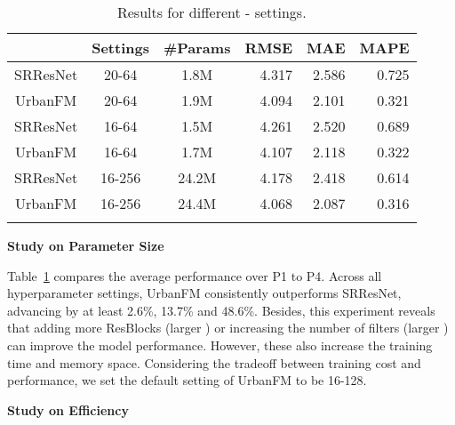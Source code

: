 \begin{table}[!b]
  \centering
  \caption{Results for different - settings.}
  \vspace{-1em}
    \begin{tabular}{c|cc|rrr}
\shline
    \multicolumn{1}{c|}{Methods} & \multicolumn{1}{l}{Settings} & \multicolumn{1}{l|}{\#Params} & \multicolumn{1}{l}{RMSE} & \multicolumn{1}{l}{MAE} & \multicolumn{1}{l}{MAPE} \\
\hline
    SRResNet & 20-64 & 1.8M  & 4.317 & 2.586 & 0.725 \\
    UrbanFM & 20-64 & 1.9M  & 4.094 & 2.101 & 0.321 \\
\hline
    SRResNet & 16-64 & 1.5M  & 4.261 & 2.520 & 0.689 \\
    UrbanFM & 16-64 & 1.7M  & 4.107 & 2.118 & 0.322 \\
\hline
    SRResNet & 16-256 & 24.2M & 4.178 & 2.418 & 0.614 \\
    UrbanFM & 16-256 & 24.4M & 4.068 & 2.087 & 0.316 \\
\shline
    \end{tabular}\label{tab:params}\end{table} 
\vspace{1mm}
\noindent\textbf{Study on Parameter Size}

\noindent Table~\ref{tab:params} compares the average performance over P1 to P4. Across all hyperparameter settings, UrbanFM consistently outperforms SRResNet, advancing by at least 2.6\%, 13.7\% and 48.6\%. Besides, this experiment reveals that adding more ResBlocks (larger ) or increasing the number of filters (larger ) can improve the model performance. However, these also increase the training time and memory space. Considering the tradeoff between training cost and performance, we set the default setting of UrbanFM to be 16-128.

\vspace{1mm}
\noindent\textbf{Study on Efficiency}

